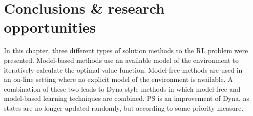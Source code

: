 %
%



\section{Conclusions \& research opportunities}\label{sec:RL-Conclusions}
In this chapter, three different types of solution methods to the \acl{RL} problem were presented. Model-based methods use an available model of the environment to iteratively calculate the optimal value function. Model-free methods are used in an on-line setting where no explicit model of the environment is available. A combination of these two leads to Dyna-style methods in which model-free and model-based learning techniques are combined. \acl{PS} is an improvement of Dyna, as states are no longer updated randomly, but according to some priority measure.

